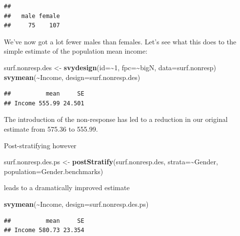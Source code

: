 \documentclass[
]{book}
\newenvironment{Shaded}{\begin{snugshade}}{\end{snugshade}}
\newcommand{\AttributeTok}[1]{\textcolor[rgb]{0.13,0.29,0.53}{#1}}
\newcommand{\DecValTok}[1]{\textcolor[rgb]{0.00,0.00,0.81}{#1}}
\newcommand{\FunctionTok}[1]{\textcolor[rgb]{0.13,0.29,0.53}{\textbf{#1}}}
\newcommand{\NormalTok}[1]{#1}
\newcommand{\OtherTok}[1]{\textcolor[rgb]{0.56,0.35,0.01}{#1}}
\newcommand{\SpecialCharTok}[1]{\textcolor[rgb]{0.81,0.36,0.00}{\textbf{#1}}}
\begin{document}
\begin{verbatim}
## 
##   male female 
##     75    107
\end{verbatim}

We've now got a lot fewer males than females. Let's see what this does to the
simple estimate of the population mean income:

\begin{Shaded}
\begin{Highlighting}[]
\NormalTok{surf.nonresp.des }\OtherTok{\textless{}{-}} \FunctionTok{svydesign}\NormalTok{(}\AttributeTok{id=}\SpecialCharTok{\textasciitilde{}}\DecValTok{1}\NormalTok{, }\AttributeTok{fpc=}\SpecialCharTok{\textasciitilde{}}\NormalTok{bigN, }\AttributeTok{data=}\NormalTok{surf.nonresp)}
\FunctionTok{svymean}\NormalTok{(}\SpecialCharTok{\textasciitilde{}}\NormalTok{Income, }\AttributeTok{design=}\NormalTok{surf.nonresp.des)}
\end{Highlighting}
\end{Shaded}

\begin{verbatim}
##          mean     SE
## Income 555.99 24.501
\end{verbatim}

The introduction of the non-response has led to a reduction in our original estimate
from 575.36 to 555.99.

Post-stratifying however

\begin{Shaded}
\begin{Highlighting}[]
\NormalTok{surf.nonresp.des.ps }\OtherTok{\textless{}{-}} \FunctionTok{postStratify}\NormalTok{(surf.nonresp.des, }\AttributeTok{strata=}\SpecialCharTok{\textasciitilde{}}\NormalTok{Gender, }
                                    \AttributeTok{population=}\NormalTok{Gender.benchmarks)}
\end{Highlighting}
\end{Shaded}

leads to a dramatically improved estimate

\begin{Shaded}
\begin{Highlighting}[]
\FunctionTok{svymean}\NormalTok{(}\SpecialCharTok{\textasciitilde{}}\NormalTok{Income, }\AttributeTok{design=}\NormalTok{surf.nonresp.des.ps)}
\end{Highlighting}
\end{Shaded}

\begin{verbatim}
##          mean     SE
## Income 580.73 23.354
\end{verbatim}
\end{document}
